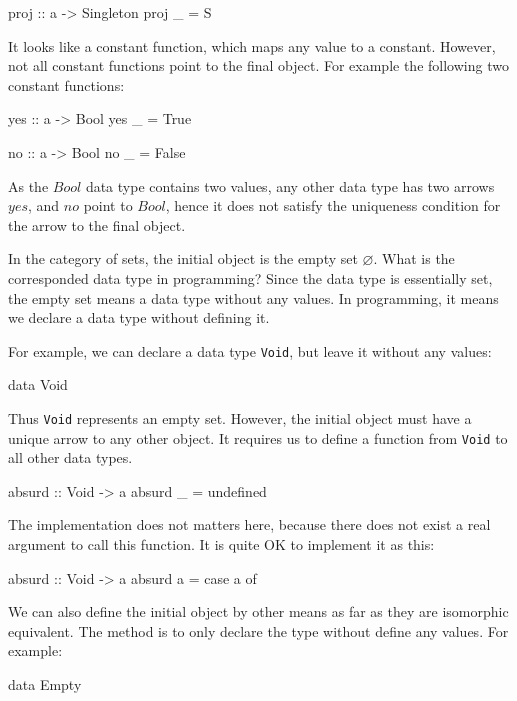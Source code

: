 \documentclass[b5paper]{article}
\begin{document}
\begin{example}
\begin{Haskell}
proj :: a -> Singleton
proj _ = S
\end{Haskell}

It looks like a constant function, which maps any value to a constant. However, not all constant functions point to the final object. For example the following two constant functions:

\begin{Haskell}
yes :: a -> Bool
yes _ = True

no :: a -> Bool
no _ = False
\end{Haskell}

As the $Bool$ data type contains two values, any other data type has two arrows $yes$, and $no$ point to $Bool$, hence it does not satisfy the uniqueness condition for the arrow to the final object.

In the category of sets, the initial object is the empty set $\varnothing$. What is the corresponded data type in programming? Since the data type is essentially set, the empty set means a data type without any values. In programming, it means we declare a data type without defining it.

For example, we can declare a data type \texttt{Void}, but leave it without any values:

\begin{Haskell}
data Void
\end{Haskell}

Thus \texttt{Void} represents an empty set. However, the initial object must have a unique arrow to any other object. It requires us to define a function from \texttt{Void} to all other data types.

\begin{Haskell}
absurd :: Void -> a
absurd _ = undefined
\end{Haskell}

The implementation does not matters here, because there does not exist a real argument to call this function. It is quite OK to implement it as this:

\begin{Haskell}
absurd :: Void -> a
absurd a = case a of {}
\end{Haskell}

We can also define the initial object by other means as far as they are isomorphic equivalent. The method is to only declare the type without define any values. For example:

\begin{Haskell}
data Empty


\end{Haskell}
\end{example}
\end{document}
